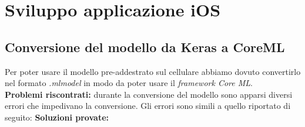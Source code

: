 \section{Sviluppo applicazione iOS}
\subsection{Conversione del modello da Keras a CoreML}
Per poter usare il modello pre-addestrato sul cellulare abbiamo dovuto convertirlo nel formato \textit{.mlmodel} in modo da poter usare il \textit{framework Core ML}.\\
\newline
\textbf{Problemi riscontrati:} durante la conversione del modello sono apparsi diversi errori che impedivano la conversione. Gli errori sono simili a quello riportato di seguito:
\vspace*{2ex}
\vspace*{2ex}
\textbf{Soluzioni provate:}
